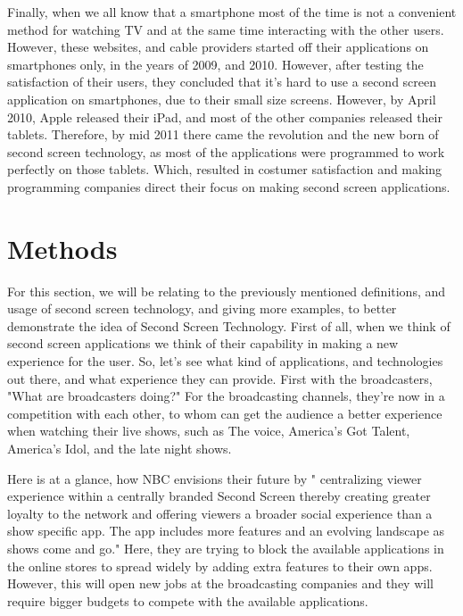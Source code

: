 \documentclass[12pt, oneside]{amsart}   	%
\begin{document}
 Finally, when we all know that a smartphone most of the time is not a convenient method for watching TV and at the same time interacting with the other users.  However, these websites, and cable providers started off their applications on smartphones only, in the years of 2009, and 2010.  However, after testing the satisfaction of their users, they concluded that it's hard to use a second screen application on smartphones, due to their small size screens.  However, by April 2010, Apple released their iPad, and most of the other companies released their tablets.  Therefore, by mid 2011 there came the revolution and the new born of second screen technology, as most of the applications were programmed to work perfectly on those tablets.  Which, resulted in costumer satisfaction and making programming companies direct their focus on making second screen applications.
 \section{Methods} 

For this section, we will be relating to the previously mentioned definitions, and usage of second screen technology, and giving more examples, to better demonstrate the idea of Second Screen Technology. First of all, when we think of second screen applications we think of their capability in making a new  experience for the user.  So, let's see what kind of applications, and technologies out there, and what experience they can provide.  First with the broadcasters, "What are broadcasters doing?" \cite{Second-Screen-Art}  For the broadcasting channels, they're now in a competition with each other, to whom can get the audience a better experience when watching their live shows, such as The voice, America's Got Talent, America's Idol, and the late night shows.

Here is at a glance, how NBC envisions their future by " centralizing viewer experience within a centrally branded Second Screen thereby creating greater loyalty to the network and offering viewers a broader social experience than a show specific app.  The app includes more features and an evolving landscape as shows come and go." \cite{Second-Screen-Art}  Here, they are trying to block the available applications in the online stores to spread widely by adding extra features to their own apps.  However, this will open new jobs at the broadcasting companies and they will require bigger budgets to compete with the available applications.
\end{document}
